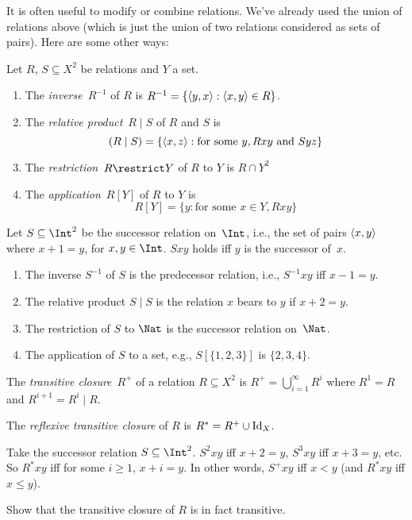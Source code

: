 \documentclass[../../../include/open-logic-section]{subfiles}
\begin{document}

It is often useful to modify or combine relations. We've already used
the union of relations above (which is just the union of two relations
considered as sets of pairs). Here are some other ways:

\begin{defn} Let $R$, $S \subseteq X^2$ be relations and $Y$ a set.
\begin{enumerate}
\item The \emph{inverse}~$R^{-1}$ of $R$ is $R^{-1} = \{ \langle y,
    x \rangle : \langle x, y \rangle \in R \}$.
\item The \emph{relative product}~$R \mid S$ of $R$ and $S$ is
\[
(R \mid S) = \{\langle x, z \rangle : \text{for some } y, Rxy \text{ and } Syz\}
\]
\item The \emph{restriction}~$R \restrict Y$ of $R$ to $Y$ is $R \cap Y^2$
\item The \emph{application}~$R[Y]$ of $R$ to $Y$ is
\[
R[Y] = \{y : \text{for some } x \in Y, Rxy\}
\]
\end{enumerate}
\end{defn}

\begin{ex}
Let $S \subseteq \Int^2$ be the successor relation on~$\Int$, i.e.,
the set of pairs $\langle x, y \rangle$ where $x + 1 = y$, for $x, y \in
\Int$. $Sxy$ holds iff $y$ is the successor of~$x$.
\begin{enumerate}
\item The inverse $S^{-1}$ of $S$ is the predecessor relation, i.e.,
  $S^{-1}xy$ iff $x-1 = y$.
\item The relative product $S\mid S$ is the relation $x$ bears to $y$
  if $x+2 = y$.
\item The restriction of $S$ to $\Nat$ is the successor relation
  on~$\Nat$.
\item The application of $S$ to a set, e.g., $S[\{1, 2, 3\}]$ is $\{2,
  3, 4\}$.
\end{enumerate}

\end{ex}

\begin{defn}
The \emph{transitive closure}~$R^+$ of a relation $R \subseteq X^2$ is
$R^+ = \bigcup_{i=1}^\infty R^i$ where $R^1 = R$ and $R^{i+1} = R^i
\mid R$.

The \emph{reflexive transitive closure} of $R$ is $R^* = R^+ \cup
\mathord{\mathrm{Id}_{X}}$.
\end{defn}

\begin{ex}
Take the successor relation $S \subseteq \Int^2$. $S^2xy$ iff $x + 2 =
y$, $S^3xy$ iff $x + 3 = y$, etc. So $R^*xy$ iff for some $i \ge 1$,
$x + i = y$. In other words, $S^+xy$ iff $x < y$ (and $R^*xy$ iff $x
\le y$).
\end{ex}

\begin{prob}
Show that the transitive closure of $R$ is in fact transitive.
\end{prob}
\end{document}
